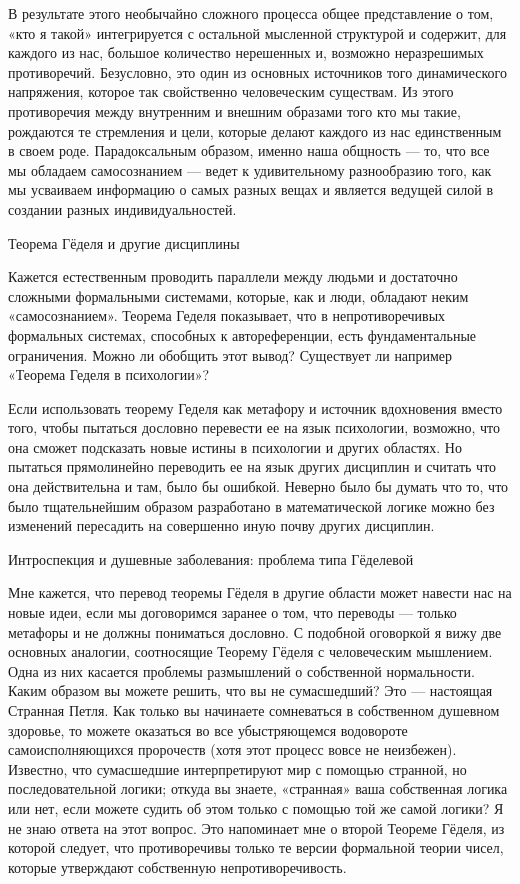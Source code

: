 \documentclass[../main.tex]{subfiles}
\begin{document}
В результате этого необычайно сложного процесса общее представление о том, «кто я такой» интегрируется с остальной мысленной структурой и содержит, для каждого из нас, большое количество нерешенных и, возможно неразрешимых противоречий. Безусловно, это один из основных источников того динамического напряжения, которое так свойственно человеческим существам. Из этого противоречия между внутренним и внешним образами того кто мы такие, рождаются те стремления и цели, которые делают каждого из нас единственным в своем роде. Парадоксальным образом, именно наша общность --- то, что все мы обладаем самосознанием --- ведет к удивительному разнообразию того, как мы усваиваем информацию о самых разных вещах и является ведущей силой в создании разных индивидуальностей.

Теорема Гёделя и другие дисциплины

Кажется естественным проводить параллели между людьми и достаточно сложными формальными системами, которые, как и люди, обладают неким «самосознанием». Теорема Геделя показывает, что в непротиворечивых формальных системах, способных к автореференции, есть фундаментальные ограничения. Можно ли обобщить этот вывод? Существует ли например «Теорема Геделя в психологии»?

Если использовать теорему Геделя как метафору и источник вдохновения вместо того, чтобы пытаться дословно перевести ее на язык психологии, возможно, что она сможет подсказать новые истины в психологии и других областях. Но пытаться прямолинейно переводить ее на язык других дисциплин и считать что она действительна и там, было бы ошибкой. Неверно было бы думать что то, что было тщательнейшим образом разработано в математической логике можно без изменений пересадить на совершенно иную почву других дисциплин.

Интроспекция и душевные заболевания: проблема типа Гёделевой

Мне кажется, что перевод теоремы Гёделя в другие области может навести нас на новые идеи, если мы договоримся заранее о том, что переводы --- только метафоры и не должны пониматься дословно. С подобной оговоркой я вижу две основных аналогии, соотносящие Теорему Гёделя с человеческим мышлением. Одна из них касается проблемы размышлений о собственной нормальности. Каким образом вы можете решить, что вы не сумасшедший? Это --- настоящая Странная Петля. Как только вы начинаете сомневаться в собственном душевном здоровье, то можете оказаться во все убыстряющемся водовороте самоисполняющихся пророчеств (хотя этот процесс вовсе не неизбежен). Известно, что сумасшедшие интерпретируют мир с помощью странной, но последовательной логики; откуда вы знаете, «странная» ваша собственная логика или нет, если можете судить об этом только с помощью той же самой логики? Я не знаю ответа на этот вопрос. Это напоминает мне о второй Теореме Гёделя, из которой следует, что противоречивы только те версии формальной теории чисел, которые утверждают собственную непротиворечивость.
\end{document}
